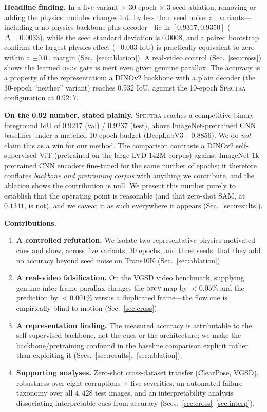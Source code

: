 \documentclass[conference]{IEEEtran}
\newcommand{\spectra}{\textsc{Spectra}}
\newcommand{\ofcv}{\textsc{ofcv}}
\newcommand{\dinov}{DINOv2}
\newcommand{\iou}{IoU}
\begin{document}
\textbf{Headline finding.} In a five-variant $\times$ 30-epoch $\times$ 3-seed
ablation, removing or adding the physics modules changes \iou{} by less than
seed noise: all variants---including a no-physics backbone-plus-decoder---lie in
$[0.9317,0.9350]$ ($\Delta=0.0033$), while the seed standard deviation is
$0.0008$, and a paired bootstrap confirms the largest physics effect
($+0.003$ \iou) is practically equivalent to zero within a $\pm0.01$ margin
(Sec.~\ref{sec:ablation}). A real-video control (Sec.~\ref{sec:cross})
shows the learned \ofcv{} gate is inert even given genuine parallax. The
accuracy is a property of the representation: a \dinov{} backbone with a plain
decoder (the 30-epoch ``neither'' variant) reaches $0.932$ \iou, against the
10-epoch \spectra{} configuration at $0.9217$.

\textbf{On the 0.92 number, stated plainly.} \spectra{} reaches a competitive
binary foreground \iou{} of $0.9217$ (val) / $0.9237$ (test), above
ImageNet-pretrained CNN baselines under a matched 10-epoch budget
(DeepLabV3+ $0.8856$). We do \emph{not} claim this as a win for our method. The
comparison contrasts a \dinov{} self-supervised ViT (pretrained on the large
LVD-142M corpus) against ImageNet-1k--pretrained CNN encoders fine-tuned for the
same number of epochs; it therefore conflates \emph{backbone and pretraining
corpus} with anything we contribute, and the ablation shows the contribution is
null. We present this number purely to establish that the operating point is
reasonable (and that zero-shot SAM, at $0.1341$, is not), and we caveat it as
such everywhere it appears (Sec.~\ref{sec:results}).

\textbf{Contributions.}
\begin{enumerate}
\item \textbf{A controlled refutation.} We isolate two representative
physics-motivated cues and show, across five variants, 30 epochs, and three
seeds, that they add no accuracy beyond seed noise on Trans10K
(Sec.~\ref{sec:ablation}).
\item \textbf{A real-video falsification.} On the VGSD video benchmark, supplying
genuine inter-frame parallax changes the \ofcv{} map by $<0.05\%$ and the
prediction by $<0.001\%$ versus a duplicated frame---the flow cue is empirically
blind to motion (Sec.~\ref{sec:cross}).
\item \textbf{A representation finding.} The measured accuracy is attributable to
the self-supervised backbone, not the cues or the architecture; we make the
backbone/pretraining confound in the baseline comparison explicit rather than
exploiting it (Secs.~\ref{sec:results},~\ref{sec:ablation}).
\item \textbf{Supporting analyses.} Zero-shot cross-dataset transfer (ClearPose,
VGSD), robustness over eight corruptions $\times$ five severities, an automated
failure taxonomy over all $4{,}428$ test images, and an interpretability
analysis dissociating interpretable cues from accuracy
(Secs.~\ref{sec:cross}--\ref{sec:interp}).
\end{enumerate}
\end{document}
